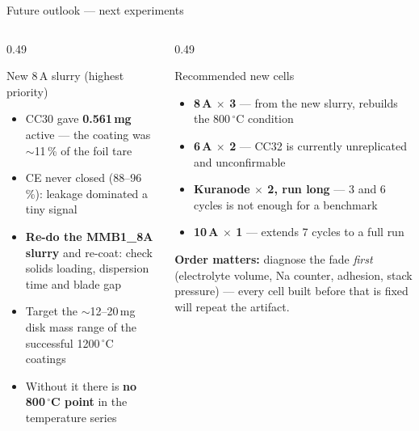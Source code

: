 \begin{frame}{Future outlook --- next experiments}
  \begin{columns}[T]
    \begin{column}{0.49\textwidth}
      \begin{block}{New 8\,A slurry (highest priority)}
        \begin{itemize}\scriptsize
          \item CC30 gave \textbf{0.561\,mg} active --- the coating was
                \(\sim\)11\,\% of the foil tare
          \item CE never closed (88--96\,\%): leakage dominated a tiny signal
          \item \textbf{Re-do the MMB1\_8A slurry} and re-coat: check solids
                loading, dispersion time and blade gap
          \item Target the \(\sim\)12--20\,mg disk mass range of the
                successful 1200\,\({^\circ}\)C coatings
          \item Without it there is \textbf{no 800\,\({^\circ}\)C point} in the
                temperature series
        \end{itemize}
      \end{block}
    \end{column}
    \begin{column}{0.49\textwidth}
      \begin{block}{Recommended new cells}
        \begin{itemize}\scriptsize
          \item \textbf{8\,A \(\times\) 3} --- from the new slurry, rebuilds the
                800\,\({^\circ}\)C condition
          \item \textbf{6\,A \(\times\) 2} --- CC32 is currently unreplicated
                and unconfirmable
          \item \textbf{Kuranode \(\times\) 2, run long} --- 3 and 6 cycles is
                not enough for a benchmark
          \item \textbf{10\,A \(\times\) 1} --- extends 7 cycles to a full run
        \end{itemize}
      \end{block}
      \vspace{-0.3em}
      {\scriptsize \textbf{Order matters:} diagnose the fade \emph{first}
      (electrolyte volume, Na counter, adhesion, stack pressure) --- every cell
      built before that is fixed will repeat the artifact.}

\end{column}
\end{columns}
\end{frame}
